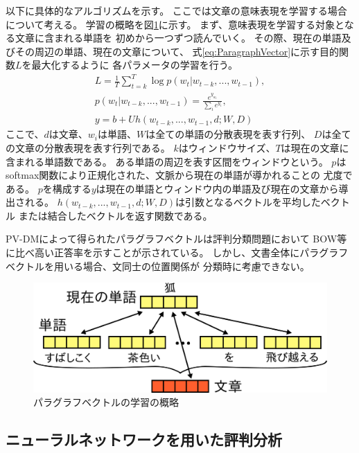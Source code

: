 \documentclass[twocolumn,a4paper]{ltjarticle}
\makeatletter
\let\tti@includegraphics\includegraphics
\renewcommand{\includegraphics}[1]{%
    \tti@includegraphics[width=\linewidth]{#1}}
\makeatother
\begin{document}
以下に具体的なアルゴリズムを示す。
ここでは文章の意味表現を学習する場合について考える。
学習の概略を図\ref{fig:ParagraphVector}に示す。
まず、意味表現を学習する対象となる文章に含まれる単語を
初めから一つずつ読んでいく。
その際、現在の単語及びその周辺の単語、現在の文章について、
式\ref{eq:ParagraphVector}に示す目的関数$L$を最大化するように
各パラメータの学習を行う。
\begin{gather}
  L = \frac{1}{T} \sum^{T}_{t = k} \log p(w_t | w_{t-k}, ..., w_{t-1}),
    \label{eq:ParagraphVector} \\
  p(w_t | w_{t-k}, ..., w_{t-1}) = \frac{e^{y_{w_t}}}{\sum_i e^{y_i}},
    \nonumber \\
  y = b + Uh(w_{t-k}, ..., w_{t-1}, d; W, D) \nonumber
\end{gather}
ここで、$d$は文章、$w_i$は単語、$W$は全ての単語の分散表現を表す行列、
$D$は全ての文章の分散表現を表す行列である。
$k$はウィンドウサイズ、$T$は現在の文章に含まれる単語数である。
ある単語の周辺を表す区間をウィンドウという。
$p$はsoftmax関数により正規化された、文脈から現在の単語が導かれることの
尤度である。
$p$を構成する$y$は現在の単語とウィンドウ内の単語及び現在の文章から導出される。
$h(w_{t-k}, ..., w_{t-1}, d; W, D)$は引数となるベクトルを平均したベクトル
または結合したベクトルを返す関数である。

PV-DMによって得られたパラグラフベクトルは評判分類問題において
BOW等に比べ高い正答率を示すことが示されている。
しかし、文書全体にパラグラフベクトルを用いる場合、文同士の位置関係が
分類時に考慮できない。

\begin{figure}[t!]
  \includegraphics{fig/paragraph_vector.png}
  \caption{パラグラフベクトルの学習の概略}
  \label{fig:ParagraphVector}
\end{figure}


\subsection{ニューラルネットワークを用いた評判分析}
\end{document}
